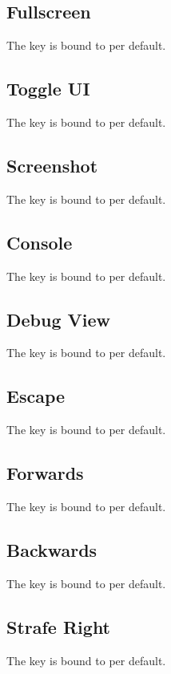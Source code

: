 \subsection{Fullscreen}\label{subsec:controls_fullscreen}
The key is bound to
per default.

\subsection{Toggle UI}\label{subsec:controls_toggle ui}
The key is bound to
per default.

\subsection{Screenshot}\label{subsec:controls_screenshot}
The key is bound to
per default.

\subsection{Console}\label{subsec:controls_console}
The key is bound to
per default.

\subsection{Debug View}\label{subsec:controls_debug view}
The key is bound to
per default.

\subsection{Escape}\label{subsec:controls_escape}
The key is bound to
per default.

\subsection{Forwards}\label{subsec:controls_forwards}
The key is bound to
per default.

\subsection{Backwards}\label{subsec:controls_backwards}
The key is bound to
per default.

\subsection{Strafe Right}\label{subsec:controls_strafe right}
The key is bound to
per default.

